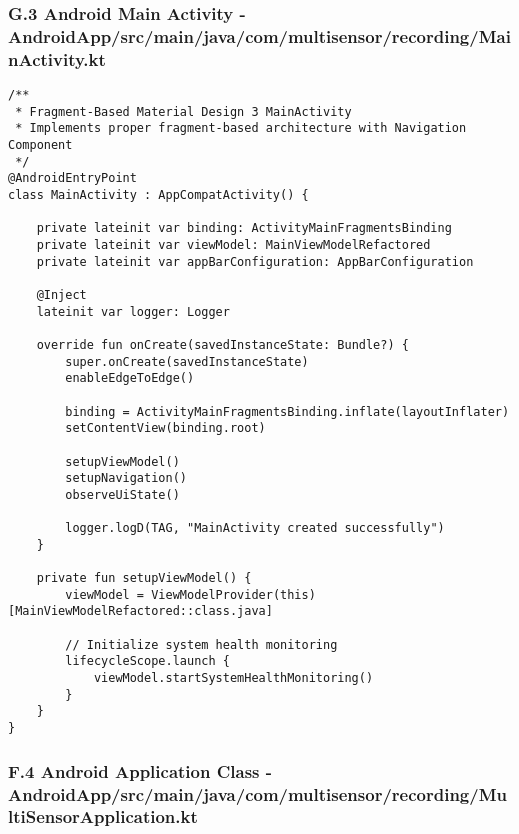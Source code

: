 \documentclass[12pt,a4paper]{article}
\begin{document}
\subsubsection{G.3 Android Main Activity - AndroidApp/src/main/java/com/multisensor/recording/MainActivity.kt}

\begin{verbatim}
/**
 * Fragment-Based Material Design 3 MainActivity
 * Implements proper fragment-based architecture with Navigation Component
 */
@AndroidEntryPoint
class MainActivity : AppCompatActivity() {
    
    private lateinit var binding: ActivityMainFragmentsBinding
    private lateinit var viewModel: MainViewModelRefactored
    private lateinit var appBarConfiguration: AppBarConfiguration
    
    @Inject
    lateinit var logger: Logger
    
    override fun onCreate(savedInstanceState: Bundle?) {
        super.onCreate(savedInstanceState)
        enableEdgeToEdge()
        
        binding = ActivityMainFragmentsBinding.inflate(layoutInflater)
        setContentView(binding.root)
        
        setupViewModel()
        setupNavigation()
        observeUiState()
        
        logger.logD(TAG, "MainActivity created successfully")
    }
    
    private fun setupViewModel() {
        viewModel = ViewModelProvider(this)[MainViewModelRefactored::class.java]
        
        // Initialize system health monitoring
        lifecycleScope.launch {
            viewModel.startSystemHealthMonitoring()
        }
    }
}
\end{verbatim}

\subsubsection{F.4 Android Application Class - AndroidApp/src/main/java/com/multisensor/recording/MultiSensorApplication.kt}
\end{document}
